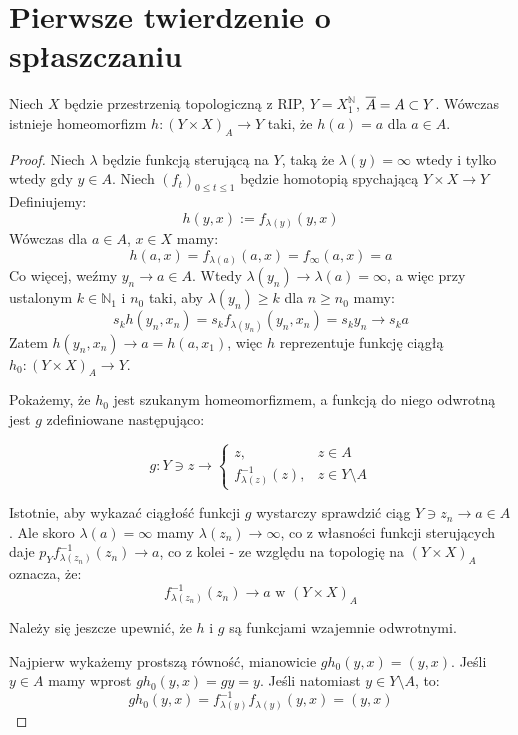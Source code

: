 \section{Pierwsze twierdzenie o spłaszczaniu}
\begin{thm}
  Niech $X$ będzie przestrzenią topologiczną z RIP, $Y = X^\mathbb{N}_1$, $\overline{A} = A \subset Y$. Wówczas istnieje homeomorfizm $h: (Y \times X)_A \rightarrow Y$ taki, że $h(a) = a$ dla $a \in A$.
  
  \begin{proof}
    Niech $\lambda$ będzie funkcją sterującą na $Y$, taką że $\lambda(y) = \infty$ wtedy i tylko wtedy gdy $y \in A$.
    Niech $(f_t)_{0 \leq t \leq 1}$ będzie homotopią spychającą $Y \times X \rightarrow Y$
    Definiujemy:
    $$h(y,x) := f_{\lambda(y)}(y,x)$$
    Wówczas dla $a \in A$, $x \in X$ mamy:
    $$h(a,x) = f_{\lambda(a)}(a,x) = f_\infty(a,x) = a$$
    Co więcej, weźmy $y_n \rightarrow a \in A$. Wtedy $\lambda(y_n) \rightarrow \lambda(a) = \infty$, a więc przy ustalonym $k \in \mathbb{N}_1$ i $n_0$ taki, aby $\lambda(y_n) \geq k$ dla $n \geq n_0$ mamy:
    $$s_k h(y_n, x_n) = s_k f_{\lambda(y_n)}(y_n,x_n) = s_k y_n \rightarrow s_k a$$
    Zatem $h(y_n,x_n) \rightarrow a = h(a, x_1)$, więc $h$ reprezentuje funkcję ciągłą $h_0: (Y \times X)_A \rightarrow Y$.
    
    Pokażemy, że $h_0$ jest szukanym homeomorfizmem, a funkcją do niego odwrotną jest $g$ zdefiniowane następująco:
    
    $$g: Y \ni z \rightarrow
    \begin{cases}
      z,& z\in A \\
      f^{-1}_{\lambda(z)}(z),& z \in Y \setminus A
    \end{cases}$$
    
    Istotnie, aby wykazać ciągłość funkcji $g$ wystarczy sprawdzić ciąg $Y \ni z_n \rightarrow a \in A$. Ale skoro $\lambda(a) = \infty$ mamy $\lambda(z_n) \rightarrow \infty$, co z własności funkcji sterujących daje $p_Y f_{\lambda(z_n)}^{-1}(z_n) \rightarrow a$, co z kolei - ze względu na topologię na $(Y \times X)_A$ oznacza, że:
    $$f_{\lambda(z_n)}^{-1}(z_n) \rightarrow a \mbox{ w } (Y \times X)_A$$

    Należy się jeszcze upewnić, że $h$ i $g$ są funkcjami wzajemnie odwrotnymi.
    
    Najpierw wykażemy prostszą równość, mianowicie $gh_0(y,x) = (y,x)$. Jeśli $y \in A$ mamy wprost $gh_0(y,x) = gy = y$. Jeśli natomiast $y \in Y \setminus A$, to:
    $$gh_0(y,x) = f^{-1}_{\lambda(y)} f_{\lambda(y)}(y,x) = (y,x)$$
    

\end{proof}
\end{thm}

